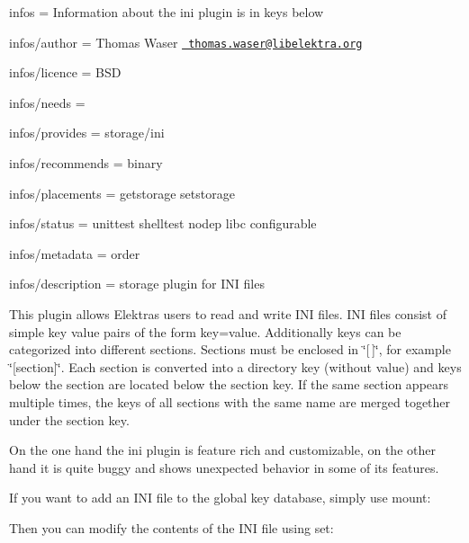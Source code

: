 
\begin{DoxyItemize}
\item infos = Information about the ini plugin is in keys below
\item infos/author = Thomas Waser \href{mailto:thomas.waser@libelektra.org}{\texttt{ thomas.\+waser@libelektra.\+org}}
\item infos/licence = B\+SD
\item infos/needs =
\item infos/provides = storage/ini
\item infos/recommends = binary
\item infos/placements = getstorage setstorage
\item infos/status = unittest shelltest nodep libc configurable
\item infos/metadata = order
\item infos/description = storage plugin for I\+NI files
\end{DoxyItemize}

This plugin allows Elektra\textquotesingle{}s users to read and write I\+NI files. I\+NI files consist of simple key value pairs of the form {\ttfamily key=value}. Additionally keys can be categorized into different sections. Sections must be enclosed in \char`\"{}\mbox{[}$\,$\mbox{]}\char`\"{}, for example \char`\"{}\mbox{[}section\mbox{]}\char`\"{}. Each section is converted into a directory key (without value) and keys below the section are located below the section key. If the same section appears multiple times, the keys of all sections with the same name are merged together under the section key.

On the one hand the ini plugin is feature rich and customizable, on the other hand it is quite buggy and shows unexpected behavior in some of its features.

If you want to add an I\+NI file to the global key database, simply use mount\+:


\begin{DoxyCode}{0}
\end{DoxyCode}


Then you can modify the contents of the I\+NI file using set\+:


\begin{DoxyCode}{0}
\end{DoxyCode}


